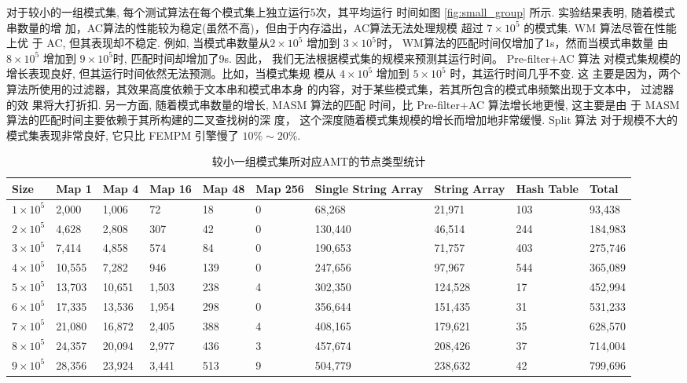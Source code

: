 对于较小的一组模式集, 每个测试算法在每个模式集上独立运行5次，其平均运行
时间如图 \ref{fig:small_group} 所示. 实验结果表明, 随着模式串数量的增
加，AC算法的性能较为稳定(虽然不高)，但由于内存溢出，AC算法无法处理规模
超过 $7 \times 10^5$ 的模式集. \textsf{WM} 算法尽管在性能上优
于 \textsf{AC}, 但其表现却不稳定. 例如, 当模式串数量从$2 \times 10^5$
增加到 $3 \times 10^5$时， WM算法的匹配时间仅增加了1s，然而当模式串数量
由 $8 \times 10^5$ 增加到 $9 \times 10^5$时, 匹配时间却增加了9s. 因此，
我们无法根据模式集的规模来预测其运行时间。 \textsf{Pre-filter+AC} 算法
对模式集规模的增长表现良好, 但其运行时间依然无法预测。比如，当模式集规
模从 $4 \times 10^5$ 增加到 $5 \times 10^5$ 时，其运行时间几乎不变. 这
主要是因为，两个算法所使用的过滤器，其效果高度依赖于文本串和模式串本身
的内容，对于某些模式集，若其所包含的模式串频繁出现于文本中， 过滤器的效
果将大打折扣. 另一方面, 随着模式串数量的增长, \textsf{MASM} 算法的匹配
时间，比 \textsf{Pre-filter+AC} 算法增长地更慢, 这主要是由
于 \textsf{MASM} 算法的匹配时间主要依赖于其所构建的二叉查找树的深
度， 这个深度随着模式集规模的增长而增加地非常缓慢. \textsf{Split} 算法
对于规模不大的模式集表现非常良好, 它只比 \textsf{FEMPM} 引擎慢了 $10\%
\sim 20\%$.


\begin{table}[!htp]
  \scriptsize
  \caption{较小一组模式集所对应AMT的节点类型统计}
  \label{tab:small}
  \begin{tabular}{p{25pt}p{25pt}p{25pt}p{25pt}p{15pt}p{15pt}p{25pt}p{25pt}p{20pt}p{25pt}}
 \hline
 Size &
 Map 1 &
 Map 4 &
 Map 16 &
 Map 48 &
 Map 256 &
 Single String Array &
 String Array   &
 Hash Table &
 Total\\
\hline
$1 \times 10^5$ &  2,000 &  1,006 &    72 &  18 & 0 &  68,268 &  21,971 & 103 &  93,438 \\
$2 \times 10^5$ &  4,628 &  2,808 &   307 &  42 & 0 & 130,440 &  46,514 & 244 & 184,983 \\
$3 \times 10^5$ &  7,414 &  4,858 &   574 &  84 & 0 & 190,653 &  71,757 & 403 & 275,746 \\
$4 \times 10^5$ & 10,555 &  7,282 &   946 & 139 & 0 & 247,656 &  97,967 & 544 & 365,089 \\
$5 \times 10^5$ & 13,703 & 10,651 & 1,503 & 238 & 4 & 302,350 & 124,528 &  17 & 452,994 \\
$6 \times 10^5$ & 17,335 & 13,536 & 1,954 & 298 & 0 & 356,644 & 151,435 &  31 & 531,233 \\
$7 \times 10^5$ & 21,080 & 16,872 & 2,405 & 388 & 4 & 408,165 & 179,621 &  35 & 628,570 \\
$8 \times 10^5$ & 24,357 & 20,094 & 2,977 & 436 & 3 & 457,674 & 208,426 &  37 & 714,004 \\
$9 \times 10^5$ & 28,356 & 23,924 & 3,441 & 513 & 9 & 504,779 & 238,632 &  42 & 799,696 \\
\hline
  \end{tabular}
\end{table}

